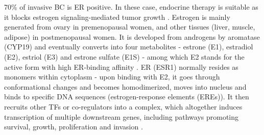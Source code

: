70\% of invasive BC is ER positive. In these case, endocrine therapy is suitable as it blocks estrogen signaling-mediated tumor growth \citep{lumachi2013treatment}. Estrogen is mainly generated from ovary in premenopausal women, and other tissues (liver, muscle, adipose) in postmenopausal women. It is developed from androgens by aromatase (CYP19) and eventually converts into four metabolites - estrone (E1), estradiol (E2), estriol (E3) and estrone sulfate (E1S) - among which E2 stands for the active form with high ER-binding affinity \citep{lonning2011exploring}. ER (ESR1) normally resides as monomers within cytoplasm - upon binding with E2, it goes through conformational changes and becomes homodimerized, moves into nucleus and binds to specific DNA sequences (estrogen-response elements (EREs)). It then recruits other TFs or co-regulators into a complex, which altogether induces transcription of multiple downstream genes, including pathways promoting survival, growth, proliferation and invasion \citep{song2006membrane}. 

